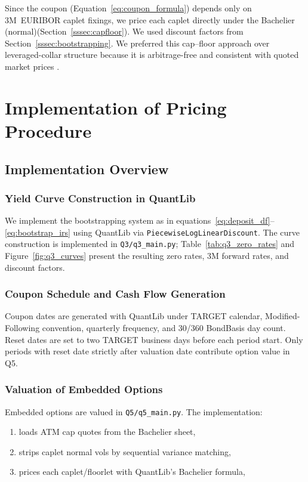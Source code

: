 \documentclass[11pt,a4paper]{article}
\begin{document}
Since the coupon
(Equation~\eqref{eq:coupon_formula}) depends only on 3M~EURIBOR caplet
fixings, we price each caplet directly under the Bachelier (normal)(Section~\ref{sssec:capfloor}). We used discount factors from Section~\ref{sssec:bootstrapping}.  We preferred this cap--floor approach over leveraged-collar structure because it is
arbitrage-free and consistent with quoted market
prices \parencite[Ch.~29]{Hull2022}.


\section{Implementation of Pricing Procedure}

\subsection{Implementation Overview}

\subsubsection{Yield Curve Construction in QuantLib}

We implement the bootstrapping system as in equations~\eqref{eq:deposit_df}--\eqref{eq:bootstrap_irs}
using QuantLib via \texttt{Piecewise\-LogLinear\-Discount}.
The curve construction is implemented in \texttt{Q3/q3\_main.py};
Table~\ref{tab:q3_zero_rates} and Figure~\ref{fig:q3_curves} present
the resulting zero rates, 3M forward rates, and discount factors.

\subsubsection{Coupon Schedule and Cash Flow Generation}

Coupon dates are generated with QuantLib under TARGET calendar,
Modified-Following convention, quarterly frequency, and 30/360 BondBasis day
count. Reset dates are set to two TARGET business days before each period start.
Only periods with reset date strictly after valuation date contribute option
value in Q5.


\subsubsection{Valuation of Embedded Options}

Embedded options are valued in \texttt{Q5/q5\_main.py}. The implementation:
\begin{enumerate}\setlength{\itemsep}{1pt}
  \item loads ATM cap quotes from the Bachelier sheet,
  \item strips caplet normal vols by sequential variance matching,
  \item prices each caplet/floorlet with QuantLib's Bachelier formula,
\end{enumerate}
\end{document}
